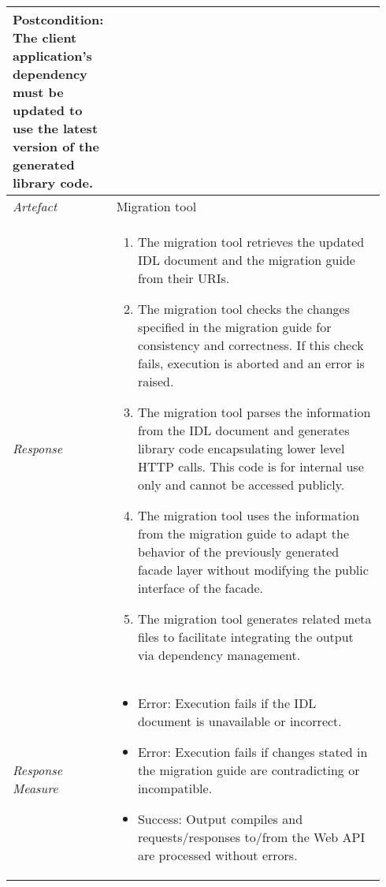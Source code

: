 \begin{center}
\begin{longtable}{ p{0.22\linewidth} p{0.72\linewidth} }
    	\textbf{Postcondition:} The client application's dependency must be updated to use the latest version of the generated library code.
    	\\
    \hline
    	\textit{Artefact} & Migration tool\\
    \hline
    \textit{Response} &
    \vspace{-5.1mm}
    \begin{enumerate}[itemindent=-9pt, leftmargin=14pt, itemsep=0pt, align=left]
        \item The migration tool retrieves the updated IDL document and the migration guide from their URIs.
        \item The migration tool checks the changes specified in the migration guide for consistency and correctness. If this check fails, execution is aborted and an error is raised.
        \item The migration tool parses the information from the IDL document and generates library code encapsulating lower level HTTP calls. This code is for internal use only and cannot be accessed publicly.
        \item The migration tool uses the information from the migration guide to adapt the behavior of the previously generated facade layer without modifying the public interface of the facade.
        \item The migration tool generates related meta files to facilitate integrating the output via dependency management.
    \end{enumerate} \\ [-5mm]
    \hline
    \textit{Response Measure} &
    \vspace{-8.5mm}
    \begin{itemize}[itemindent=-9pt, leftmargin=14pt, itemsep=0pt, align=left]
    	\item Error: Execution fails if the IDL document is unavailable or incorrect.
       	\item Error: Execution fails if changes stated in the migration guide are contradicting or incompatible.
       	\item Success: Output compiles and requests/responses to/from the Web API are processed without errors. 
        \vspace{-5mm}
    \end{itemize}\\
    \hline
    \end{longtable}
\end{center}